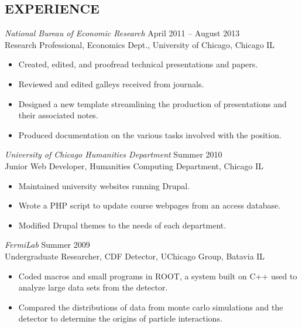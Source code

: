 \documentclass[line,margin]{res}
\begin{document}
\address{3040 17th Ave W, Unit 508, Seattle, WA 98119}
\address{(770) 833-3134\\ jake.whitaker@gmail.com}

\begin{resume}
  
  \section{EXPERIENCE}
  
  {\sl National Bureau of Economic Research}
  \hfill April 2011 -- August 2013 \\
  Research Professional, Economics Dept., University of Chicago, Chicago IL
  \begin{itemize}  \itemsep-2pt
  \item Created, edited, and proofread technical presentations and papers.
  \item Reviewed and edited galleys received from journals.
  \item Designed a new template streamlining the production of presentations and their associated notes.
  \item Produced documentation on the various tasks involved with the position.
  \end{itemize}
  
  {\sl University of Chicago Humanities Department}
  \hfill Summer 2010 \\
  Junior Web Developer, Humanities Computing Department,
  Chicago IL
  \begin{itemize}  \itemsep-2pt
  \item Maintained university websites running Drupal.
  \item Wrote a PHP script to update course webpages from an access database.
  \item Modified Drupal themes to the needs of each department.
  \end{itemize}

  
  {\sl FermiLab} \hfill Summer 2009 \\
  Undergraduate Researcher, CDF Detector, UChicago Group, Batavia IL
  \begin{itemize}  \itemsep-2pt
  \item Coded macros and small programs in ROOT, a system built on C++ used to analyze large data sets from the detector.
  \item Compared the distributions of data from monte carlo simulations and the detector to determine the origins of particle interactions.
  \end{itemize}
  

\end{resume}
\end{document}
